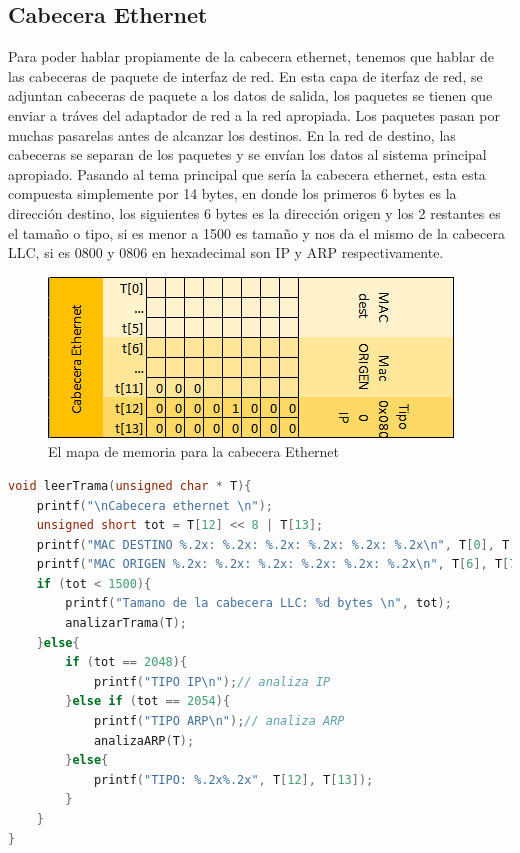 		\subsection{Cabecera Ethernet}
		Para poder hablar propiamente de la cabecera ethernet, tenemos que hablar de las cabeceras de paquete de interfaz de red.
\vskip 1pt
		En esta capa de iterfaz de red, se adjuntan cabeceras de paquete a los datos de salida, los paquetes se tienen que enviar a tr\'aves del adaptador de red a la red apropiada. Los paquetes pasan por muchas pasarelas antes de alcanzar los destinos. En la red de destino, las cabeceras se separan de los paquetes y se env\'ian los datos al sistema principal apropiado.
\vskip 1pt
		Pasando al tema principal que ser\'ia la cabecera ethernet, esta esta compuesta simplemente por 14 bytes, en donde los primeros 6 bytes es la direcci\'on destino, los siguientes 6 bytes es la direcci\'on origen y los 2 restantes es el tama\~no o tipo, si es menor a 1500 es tama\~no y nos da el mismo de la cabecera LLC, si es 0800 y 0806 en hexadecimal son IP y ARP respectivamente.
	\begin{figure}[h]
			\centering		
			\includegraphics[width=\textwidth]{MapaMemoriaCEthernet}
			\caption{El mapa de memoria para la cabecera Ethernet}
		\end{figure}
		\begin{lstlisting}[language={C}, caption={Funcion que Analiza Cabecera Ethernet}, label={Script}]
	void leerTrama(unsigned char * T){
    printf("\nCabecera ethernet \n");
    unsigned short tot = T[12] << 8 | T[13];
    printf("MAC DESTINO %.2x: %.2x: %.2x: %.2x: %.2x: %.2x\n", T[0], T[1], T[2], T[3], T[4], T[5]);
    printf("MAC ORIGEN %.2x: %.2x: %.2x: %.2x: %.2x: %.2x\n", T[6], T[7], T[8], T[9], T[10], T[11]);
    if (tot < 1500){
        printf("Tamano de la cabecera LLC: %d bytes \n", tot);
        analizarTrama(T);
    }else{
        if (tot == 2048){
            printf("TIPO IP\n");// analiza IP
        }else if (tot == 2054){
            printf("TIPO ARP\n");// analiza ARP
            analizaARP(T);
        }else{
            printf("TIPO: %.2x%.2x", T[12], T[13]);
        }
    }
}
	\end{lstlisting}
		\clearpage
